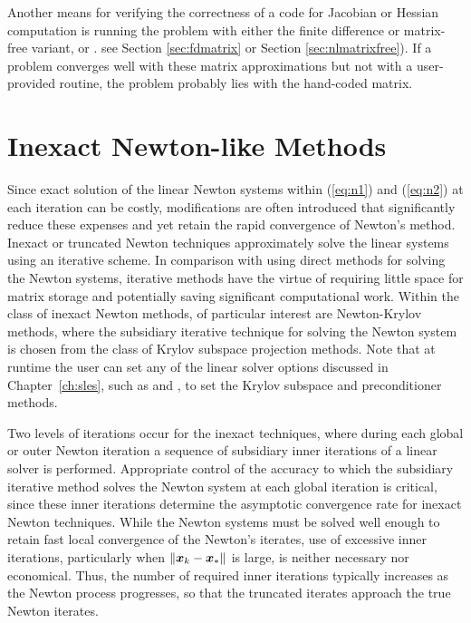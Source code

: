 Another means for verifying the correctness of a code for Jacobian or
Hessian computation is running the problem with either the finite
difference or matrix-free variant,  or .
see Section \ref{sec:fdmatrix} or Section \ref{sec:nlmatrixfree}). 
If a problem converges well
with these matrix approximations but not with a user-provided routine,
the problem probably lies with the hand-coded
matrix.  

\section{Inexact Newton-like Methods}

Since exact solution of the linear Newton systems within (\ref{eq:n1}) 
and (\ref{eq:n2}) at each iteration can be costly, modifications 
are often introduced that significantly reduce these expenses and 
yet retain the rapid convergence of Newton's method.  Inexact or 
truncated Newton techniques approximately solve the linear systems 
using an iterative scheme.  In comparison with using direct methods 
for solving the Newton systems, iterative methods have the virtue 
of requiring little space for matrix storage and potentially saving 
significant computational work.  Within the class of inexact Newton 
methods, of particular interest are Newton-Krylov methods, where the 
subsidiary iterative technique for solving the Newton system is 
chosen from the class of Krylov subspace projection methods. 
Note that at runtime the user can set any of the linear solver
options discussed in Chapter~\ref{ch:sles}, such as 
 and ,
to set the Krylov subspace and preconditioner methods.

Two levels of iterations occur for the inexact techniques, where 
during each global or outer Newton iteration a sequence of 
subsidiary inner iterations of a linear solver is performed.
Appropriate control of the accuracy to which the subsidiary 
iterative method solves the Newton system
at each global iteration is critical, since these 
inner iterations determine the asymptotic convergence rate for 
inexact Newton techniques.
While the Newton systems must be solved well enough to retain
fast local convergence of the Newton's iterates, use of excessive
inner iterations, particularly when $ \| \mbox{\boldmath \(x\)}_k - \mbox{\boldmath \(x\)}_* \| $ is large,
is neither necessary nor economical.
Thus, the number of required inner iterations typically increases
as the Newton process progresses, so that the truncated iterates
approach the true Newton iterates.

